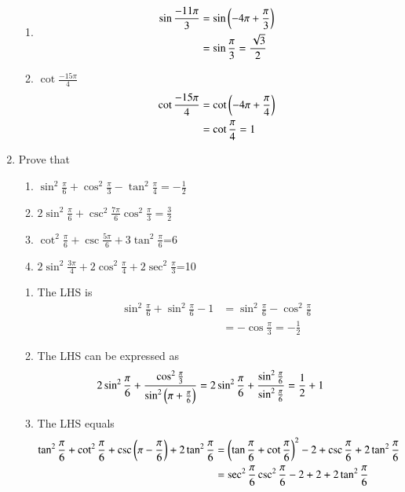 \begin{enumerate}[label=\thesubsection.\arabic*,ref=\thesubsection.\theenumi,itemsep=1ex]
\begin{enumerate}
\item 
\begin{align}
\sin\frac{-11\pi}{3}
	&=\sin\left(-4\pi +\frac{\pi}{3}\right)
	\\
	&=\sin{\frac{\pi}{3}}=\frac{\sqrt{3}}{2}
\end{align}
\item $\cot\frac{-15\pi}{4}$
\begin{align}
\cot\frac{-15\pi}{4}
	&=\cot\left(-4\pi+\frac{\pi}{4}\right)
	\\
	&=\cot{\frac{\pi}{4}}=1
\end{align}
\end{enumerate}
\item Prove that
\begin{multicols}{2}
\begin{enumerate}
\item $\sin^{2}\frac{\pi}{6}+\cos^{2}\frac{\pi}{3}-\tan^{2}\frac{\pi}{4}=-\frac{1}{2}$
\item $2\sin^{2}\frac{\pi}{6}+\csc^{2}\frac{7\pi}{6}\cos^{2}\frac{\pi}{3}=\frac{3}{2}$
\item $\cot^{2}\frac{\pi}{6}+\csc\frac{5\pi}{6}+3\tan^{2}\frac{\pi}{6}$=6
\item $2\sin^{2}\frac{3\pi}{4}+2\cos^{2}\frac{\pi}{4}+2\sec^{2}\frac{\pi}{3}$=10
\end{enumerate}
\end{multicols}
%
\solution
\begin{enumerate}
\item The LHS is
\begin{align}
\sin^{2}\frac{\pi}{6}+\sin^{2}\frac{\pi}{6}-1
	&=
\sin^{2}\frac{\pi}{6}-\cos^{2}\frac{\pi}{6}
\\
	&=-\cos\frac{\pi}{3}=-\frac{1}{2}
\end{align}
\item The LHS can be expressed as
\begin{align}
	2\sin^{2}\frac{\pi}{6}+\frac{\cos^{2}\frac{\pi}{3}}{\sin^{2}\left(\pi +\frac{\pi}{6}\right)} &= 
	2\sin^{2}\frac{\pi}{6}+\frac{\sin^{2}\frac{\pi}{6}}{\sin^{2}{\frac{\pi}{6}}} = \frac{1}{2} + 1 
\end{align}
\item The LHS equals
\begin{align}
	\tan^{2}\frac{\pi}{6}+\cot^{2}\frac{\pi}{6}+\csc\brak{\pi-\frac{\pi}{6}}+2\tan^{2}\frac{\pi}{6}
	&=
	\brak{\tan\frac{\pi}{6}+\cot\frac{\pi}{6}}^2-2+\csc{\frac{\pi}{6}}+2\tan^{2}\frac{\pi}{6}
	\\
	&=
	\sec^2\frac{\pi}{6}\csc^2\frac{\pi}{6}-2+2+2\tan^{2}\frac{\pi}{6}

\end{align}
\end{enumerate}
\end{enumerate}
